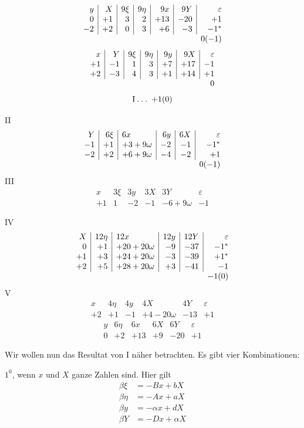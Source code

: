 \[
\begin{array}{r|r|r|r|r|r|r}
y&X&9\xi&9\eta&9x&9Y&\varepsilon\\
0&+1&3&2&+13&-20&+1\\
-2&+2&0&3&+6&-3&-1^{*}\\
\multicolumn{6}{c}{}&0(-1)
\end{array}
\]
\[
\begin{array}{r|r|r|r|r|r|r}
x&Y&9\xi&9\eta&9y&9X&\varepsilon\\
+1&-1&1&3&+7&+17&-1\\
+2&-3&4&3&+1&+14&+1\\
\multicolumn{6}{c}{}&0
\end{array}
\]
\[
\mathrm{I}\mathbin{.}\mathbin{.}\mathbin{.}\;+1(0)
\]

\noindent II
\[
\begin{array}{r|r|l|r|r|r}
Y&6\xi&6x&6y&6X&\varepsilon\\
-1&+1&+3+9\omega&-2&-1&-1^{*}\\
-2&+2&+6+9\omega&-4&-2&+1\\
\multicolumn{5}{c}{}&0(-1)
\end{array}
\]
\noindent III
\[
\begin{array}{r|r|r|r|l|r}
x&3\xi&3y&3X&3Y&\varepsilon\\
+1&1&-2&-1&-6+9\omega&-1
\end{array}
\]

\noindent IV
\[
\begin{array}{r|r|l|r|r|r}
X&12\eta&12x&12y&12Y&\varepsilon\\
0&+1&+20+20\omega&-9&-37&-1^{*}\\
+1&+3&+24+20\omega&-3&-39&+1^{*}\\
+2&+5&+28+20\omega&+3&-41&-1\\
\multicolumn{5}{c}{}&-1(0)
\end{array}
\]
\noindent V
\[
\begin{array}{r|r|r|l|r|r}
x&4\eta&4y&4X&4Y&\varepsilon\\
+2&+1&-1&+4-20\omega&-13&+1
\end{array}
\]
\[
\begin{array}{r|r|r|r|r|r}
y&6\eta&6x&6X&6Y&\varepsilon\\
0&+2&+13&+9&-20&+1
\end{array}
\]

Wir wollen nun das Resultat von I näher betrachten. Es gibt vier Kombinationen:\par
\noindent $1^0$, wenn $x$ und $X$ ganze Zahlen sind. Hier gilt
\[
\begin{aligned}
\beta\xi&=-Bx+bX\\
\beta\eta&=-Ax+aX\\
\beta y&=-\alpha x+dX\\
\beta Y&=-Dx+\alpha X
\end{aligned}
\]

